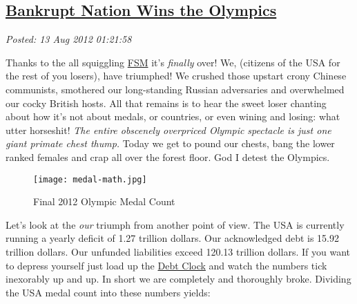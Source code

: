 %

\subsection*{\href{http://bakerjd99.wordpress.com/2012/08/12/bankrupt-nation-wins-the-olympics/}{Bankrupt Nation Wins the Olympics}}


\noindent\emph{Posted: 13 Aug 2012 01:21:58}
\vspace{6pt}

Thanks to the all squiggling \href{http://www.venganza.org/}{FSM} it's
\emph{finally} over! We, (citizens of the USA for the rest of you
losers), have triumphed! We crushed those upstart crony Chinese
communists, smothered our long-standing Russian adversaries and
overwhelmed our cocky British hosts. All that remains is to hear the
sweet loser chanting about how it's not about medals, or countries, or
even wining and losing: what utter horseshit! \emph{The entire obscenely
overpriced Olympic spectacle is just one giant primate chest thump.}
Today we get to pound our chests, bang the lower ranked females and crap
all over the forest floor. God I detest the Olympics.



\captionsetup[figure]{labelformat=empty}
\begin{figure}[htbp]
\centering
\texttt{[image: medal-math.jpg]}
\caption{Final 2012 Olympic Medal Count}
\label{fig:3145X0}
\end{figure}

Let's look at the \emph{our} triumph from
another point of view. The USA is currently running a yearly deficit of
1.27 trillion dollars. Our acknowledged debt is 15.92 trillion dollars.
Our unfunded liabilities exceed 120.13 trillion dollars. If you want to
depress yourself just load up the
\href{http://www.usdebtclock.org/}{Debt Clock} and watch the numbers tick
inexorably up and up. In short we are completely and thoroughly broke.
Dividing the USA medal count into these numbers yields:

